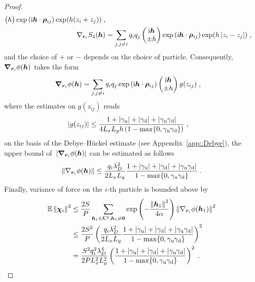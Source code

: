 \begin{proof}
\begin{align*}
\begin{pmatrix}
 h  \end{pmatrix}\exp{(\mathrm{i} \boldsymbol{h} \cdot \boldsymbol{\rho}_{ij})}\exp(h(z_i+z_j))\;,\\
 \nabla_{\bm{r}_i} S_4(\boldsymbol{h})&=\sum_{j,j\neq i}q_iq_j   \begin{pmatrix} \mathrm{i} \boldsymbol{h} \\
 \pm h  \end{pmatrix}\exp{(\mathrm{i} \boldsymbol{h} \cdot \boldsymbol{\rho}_{ij})}\exp(h\left\lvert z_i-z_j\right\rvert)\;,\\
\end{align*}
and  the choice of $+$ or $-$ depends on the choice of particle. Consequently, $\boldsymbol{\nabla}_{\boldsymbol{r}_i} \phi(\boldsymbol{h})$ takes the form
\begin{align*}
  \boldsymbol{\nabla}_{\boldsymbol{r}_i} \phi(\boldsymbol{h})  &=\sum_{j,j\neq i}q_iq_j  \exp{(\mathrm{i} \boldsymbol{h} \cdot \boldsymbol{\rho}_{ij})} \begin{pmatrix} \mathrm{i} \boldsymbol{h} \\
 \pm h  \end{pmatrix}g(z_{ij})\;,
\end{align*}
where the estimates on $g(z_{ij})$ reads
\begin{align*}
  \left\lvert g(z_{ij})  \right\rvert&\leq  \frac{1+\left\lvert\gamma_{\mathrm{u}}\right\rvert+\left\lvert\gamma_{\mathrm{d}}\right\rvert+\left\lvert\gamma_{\mathrm{u}}\gamma_{\mathrm{d}}\right\rvert}{4  L_xL_y h \left(1-\max\{0,\gamma_{\mathrm{u}}\gamma_{\mathrm{d}}\}\right)}\;,
\end{align*}
on the basis of the Debye--H\"uckel estimate (see Appendix~\ref{app::Debye}), the upper bound of~$\lvert\boldsymbol{\nabla}_{\boldsymbol{r}_i} \phi(\boldsymbol{h})\rvert$ can be estimated as follows 
\begin{equation}
  \left\lVert\nabla_{\bm{r}_i}\phi(\boldsymbol{h})\right\rVert\leq \frac{q_i\lambda_{D}^2}{2  L_xL_y}    \frac{1+\left\lvert\gamma_{\mathrm{u}}\right\rvert+\left\lvert\gamma_{\mathrm{d}}\right\rvert+\left\lvert\gamma_{\mathrm{u}}\gamma_{\mathrm{d}}\right\rvert}{1-\max\{0,\gamma_{\mathrm{u}}\gamma_{\mathrm{d}}\}}\;.
\end{equation}
Finally,  variance of force on the $i$-th particle is bounded above by
\begin{align*}
   	\mathbb{E}\left\lVert\boldsymbol{\chi}_{i}\right\rVert^2&\leq   \frac{2S}{P}\sum_{\bm{h}_1\in\mathcal{K}^2, \bm{h}_1\neq \bm{0}}\exp\left(-\frac{\left\lVert\boldsymbol{h}_1\right\rVert^2}{4\alpha}\right)\left\lVert\nabla_{\bm{r}_i}\phi(\boldsymbol{h}_1)\right\rVert^2\\
    &\leq  \frac{2S^2}{P}\left(\frac{q_i\lambda_{D}^2}{2  L_xL_y}    \frac{1+\left\lvert\gamma_{\mathrm{u}}\right\rvert+\left\lvert\gamma_{\mathrm{d}}\right\rvert+\left\lvert\gamma_{\mathrm{u}}\gamma_{\mathrm{d}}\right\rvert}{1-\max\{0,\gamma_{\mathrm{u}}\gamma_{\mathrm{d}}\}}\right)^2\\
    &= \frac{ S^2q_i^2\lambda_{D}^4}{2P L_x^2L_y^2}\left( \frac{1+\left\lvert\gamma_{\mathrm{u}}\right\rvert+\left\lvert\gamma_{\mathrm{d}}\right\rvert+\left\lvert\gamma_{\mathrm{u}}\gamma_{\mathrm{d}}\right\rvert}{1-\max\{0,\gamma_{\mathrm{u}}\gamma_{\mathrm{d}}\}}\right)^2\;.
\end{align*}
\end{proof}
